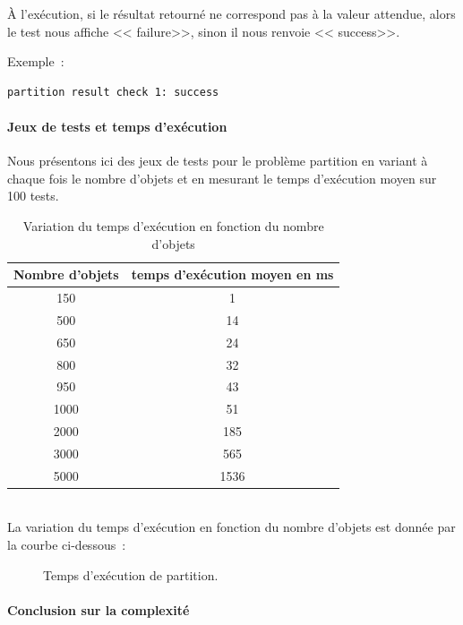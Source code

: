\documentclass[a4paper, 12pt]{article}
\begin{document}
À l'exécution, si le résultat retourné ne correspond pas à la valeur attendue, alors le test nous affiche << failure>>, sinon il nous renvoie << success>>.

Exemple~:
\begin{lstlisting}
partition result check 1: success
\end{lstlisting}

\paragraph{Jeux de tests et temps d'exécution}

Nous présentons ici des jeux de tests pour le problème partition en variant à chaque fois le nombre d'objets et en mesurant le temps d'exécution moyen sur 100 tests.
\begin{table}[h!]
\centering
\begin{tabular}{|c|c|}
\hline
Nombre d'objets & temps d'exécution moyen en ms\\
\hline
150 & 1\\
\hline
500 & 14\\
\hline
650 & 24\\
\hline
800 & 32\\
\hline
950 & 43\\
\hline
1000 & 51\\
\hline
2000 & 185\\
\hline
3000 & 565\\
\hline
5000 & 1536\\
\hline
\end{tabular}
\caption {Variation du temps d'exécution en fonction du nombre d'objets}
\end{table}\\
La variation du temps d'exécution en fonction du nombre d'objets est donnée par la courbe ci-dessous~:
\begin{figure}[h!]
\centering
{}
\caption{Temps d'exécution de partition.}
\end{figure}

\paragraph{Conclusion sur la complexité}
\end{document}
